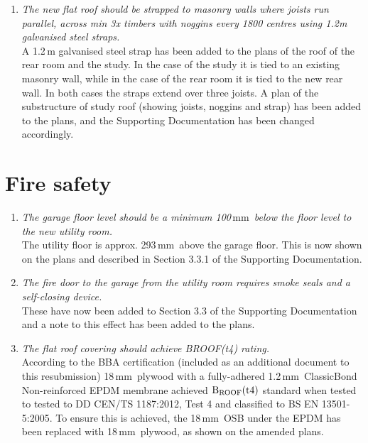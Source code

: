 \documentclass{extension}
\newcommand{\mm}{\,$\mathrm{mm}$}
\begin{document}
\begin{enumerate}
\item {\it The new flat roof should be strapped to masonry walls where joists run parallel, across min 3x timbers with noggins every 1800 centres using 1.2m galvanised steel straps.}\\
A 1.2\,m galvanised steel strap has been added to the plans of the roof of the rear room and the study. In the case of the study it is tied to an existing masonry wall, while in the case of the rear room it is tied to the new rear wall. In both cases the straps extend over three joists. A plan of the substructure of study roof (showing joists, noggins and strap) has been added to the plans, and the Supporting Documentation has been changed accordingly.
\end{enumerate}

\section{Fire safety}
\begin{enumerate}
\item {\it The garage floor level should be a minimum 100\mm\ below the floor level to the new utility room.}\\
The utility floor is approx. 293\mm\ above the garage floor. This is now shown on the plans and described in Section 3.3.1 of the Supporting Documentation.
\item {\it The fire door to the garage from the utility room requires smoke seals and a self-closing device.}\\
These have now been added to Section 3.3 of the Supporting Documentation and a note to this effect has been added to the plans.
\item {\it The flat roof covering should achieve BROOF(t4) rating.}\\According to the BBA certification (included as an additional document to this resubmission) 18\mm\ plywood with a fully-adhered 1.2\mm\ ClassicBond Non-reinforced EPDM membrane achieved ${\rm B_{ROOF}(t4)}$ standard when tested to tested to DD CEN/TS 1187:2012, Test 4 and classified to BS EN 13501-5:2005. To ensure this is achieved, the 18\mm\ OSB under the EPDM has been replaced with 18\mm\ plywood, as shown on the amended plans.
\end{enumerate}
\end{document}
